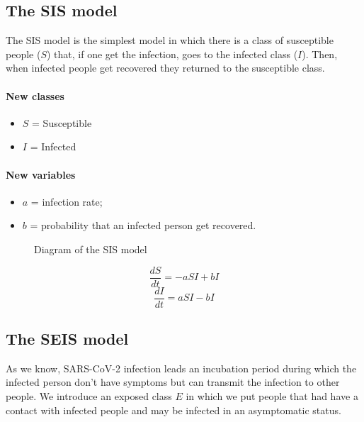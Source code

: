 \documentclass[12pt]{llncs}
\begin{document}
\subsection{The SIS model}
The SIS model is the simplest model in which there is a class of susceptible people ($S$) that, if one get the infection, goes to the infected class ($I$). Then, when infected people get recovered they returned to the susceptible class.

\paragraph{New classes}
\begin{itemize}
\item $S$ = Susceptible
\item $I$ = Infected
\end{itemize}

\paragraph{New variables}
\begin{itemize}
\item $a$ = infection rate;
\item $b$ = probability that an infected person get recovered.
\end{itemize}

\begin{figure}[H]
	\centering
    \caption{Diagram of the SIS model}
\end{figure}

$$\frac{dS}{dt} = -aSI + bI$$
$$\frac{dI}{dt} = aSI - bI$$

\subsection{The SEIS model}
As we know, SARS-CoV-2 infection leads an incubation period during which the infected person don't have symptoms but can transmit the infection to other people. We introduce an exposed class $E$ in which we put people that had have a contact with infected people and may be infected in an asymptomatic status.
\end{document}
